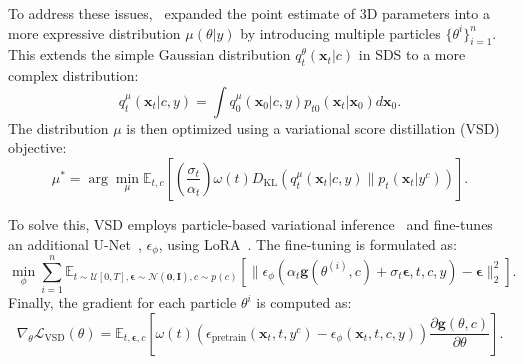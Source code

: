 To address these issues,~\citet{wang2024prolificdreamer} expanded the point estimate of 3D parameters into a more expressive distribution $\mu(\theta|y)$ by introducing multiple particles $\{\theta^i\}_{i=1}^n$. This extends the simple Gaussian distribution $q^\theta_t(\boldsymbol{x}_t|c)$ in SDS to a more complex distribution:
\begin{equation}
q^\mu_t(\boldsymbol{x}_t|c, y) = \int q^\mu_0(\boldsymbol{x}_0|c, y) p_{t0}(\boldsymbol{x}_t|\boldsymbol{x}_0) d \boldsymbol{x}_0.
\end{equation}
The distribution $\mu$ is then optimized using a variational score distillation (VSD) objective:
\begin{equation}
    \mu^* = \arg\min_\mu \mathbb{E}_{t, c} \left[ \left( \frac{\sigma_t}{\alpha_t} \right) \omega(t) D_{\mathrm{KL}}(q_t^\mu(\boldsymbol{x}_t|c, y) \parallel p_t(\boldsymbol{x}_t|y^c)) \right].
\end{equation}

To solve this, VSD employs particle-based variational inference~\citep{chen2018unified, liu2016stein} and fine-tunes an additional U-Net~\citep{ronneberger2015u}, $\epsilon_\phi$, using LoRA~\citep{hu2021lora}. The fine-tuning is formulated as:
\begin{equation}\label{eq:vsd_lora}
    \min_\phi \sum_{i=1}^n \mathbb{E}_{t \sim \mathcal{U}[0, T], \boldsymbol{\epsilon} \sim \mathcal{N}(\boldsymbol{0}, \boldsymbol{I}), c \sim p(c)} \left[ \| \epsilon_\phi(\alpha_t \boldsymbol{g}(\theta^{(i)}, c) + \sigma_t \boldsymbol{\epsilon}, t, c, y) - \boldsymbol{\epsilon} \|_2^2 \right].
\end{equation}
Finally, the gradient for each particle $\theta^i$ is computed as:
\begin{equation}
    \nabla_\theta \mathcal{L}_{\mathrm{VSD}}(\theta) = \mathbb{E}_{t, \boldsymbol{\epsilon}, c} \left[ \omega(t) \left( \epsilon_{\mathrm{pretrain}}(\boldsymbol{x}_t, t, y^c) - \epsilon_\phi(\boldsymbol{x}_t, t, c, y) \right) \frac{\partial \boldsymbol{g}(\theta, c)}{\partial \theta} \right].
\end{equation} 